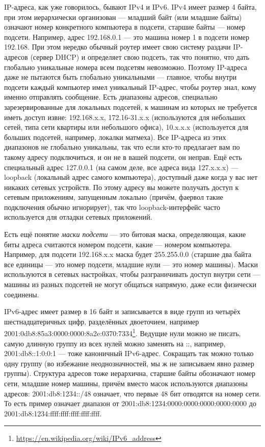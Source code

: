 \documentclass{../../text-style}
\begin{document}
IP-адреса, как уже говорилось, бывают IPv4 и IPv6. IPv4 имеет размер 4 байта, при этом иерархически организован --- младший байт (или младшие байты) означают номер конкретного компьютера в подсети, старшие байты --- номер подсети. Например, адрес 192.168.0.1 --- это машина номер 1 в подсети номер 192.168. При этом нередко обычный роутер имеет свою систему раздачи IP-адресов (сервер DHCP) и определяет свою подсеть, так что понятно, что дать глобально уникальные номера всем подсетям невозможно. Поэтому IP-адреса даже не пытаются быть глобально уникальными --- главное, чтобы внутри подсети каждый компьютер имел уникальный IP-адрес, чтобы роутер знал, кому именно отправлять сообщение. Есть диапазоны адресов, специально зарезервированные для локальных подсетей, к машинам из которых не требуется иметь доступ извне: 192.168.x.x, 172.16-31.x.x (используются для небольших сетей, типа сети квартиры или небольшого офиса), 10.x.x.x (используется для больших подсетей, например, локалки матмеха). Все IP-адреса из этих диапазонов не глобально уникальны, так что если кто-то предлагает вам по такому адресу подключиться, и он не в вашей подсети, он неправ. Ещё есть специальный адрес 127.0.0.1 (на самом деле, все адреса вида 127.x.x.x) ---  loopback (локальный адрес самого компьютера), доступный даже когда у вас нет никаких сетевых устройств. По этому адресу вы можете получать доступ к сетевым приложениям, запущенным локально (причём, фаервол такие подключения обычно игнорирует), так что loopback-интерфейс часто используется для отладки сетевых приложений. 

Есть ещё понятие \textit{маски подсети} --- это битовая маска, определяющая, какие биты адреса считаются номером подсети, какие --- номером компьютера. Например, для подсети 192.168.x.x маска будет 255.255.0.0 (старшие два байта все единицы --- это номер подсети, младшие нули --- это номер машины). Маски используются в сетевых настройках, чтобы разграничивать доступ внутри сети --- машины из разных подсетей не могут общаться напрямую, даже если физически соединены.

IPv6-адрес имеет размер в 16 байт и записывается в виде групп из четырёх шестнадцатеричных цифр, разделённых двоеточием, например 2001:0db8:85a3:0000:0000:8a2e:0370:7334\footnote{\url{https://en.wikipedia.org/wiki/IPv6_address}}. Ведущие нули можно не писать, самую длинную группу из всех нулей можно заменять на ::, например, 2001:db8::1:0:0:1 --- тоже каноничный IPv6-адрес. Сокращать так можно только одну группу (во избежание неоднозначностей, мы ж не записываем явно размер группы). Структура адресов тоже иерархична, старшие байты обозначают номер сети, младшие номер машины, причём вместо масок используются диапазоны адресов: 2001:db8:1234::/48 означает, что первые 48 бит отводятся на номер сети. То есть пример означает диапазон от 2001:db8:1234:0000:0000:0000:0000:0000 до 2001:db8:1234:ffff:ffff:ffff:ffff:ffff.
\end{document}
